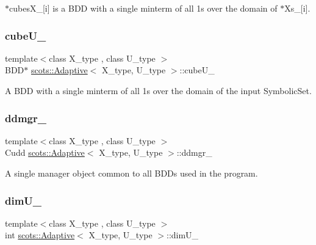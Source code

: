 $\ast$cubes\+X\+\_\+\mbox{[}i\mbox{]} is a B\+DD with a single minterm of all 1s over the domain of $\ast$\+Xs\+\_\+\mbox{[}i\mbox{]}. \mbox{\label{classscots_1_1Adaptive_a0332230a9bad14d432e6651611863be9}} 
\subsubsection{\texorpdfstring{cube\+U\+\_\+}{cubeU\_}}
{\footnotesize\ttfamily template$<$class X\+\_\+type , class U\+\_\+type $>$ \\
B\+DD$\ast$ \hyperlink{classscots_1_1Adaptive}{scots\+::\+Adaptive}$<$ X\+\_\+type, U\+\_\+type $>$\+::cube\+U\+\_\+}

A B\+DD with a single minterm of all 1s over the domain of the input Symbolic\+Set. \mbox{\label{classscots_1_1Adaptive_a4d986f797368f4e1f74dd7d8a37df2dd}} 
\subsubsection{\texorpdfstring{ddmgr\+\_\+}{ddmgr\_}}
{\footnotesize\ttfamily template$<$class X\+\_\+type , class U\+\_\+type $>$ \\
Cudd \hyperlink{classscots_1_1Adaptive}{scots\+::\+Adaptive}$<$ X\+\_\+type, U\+\_\+type $>$\+::ddmgr\+\_\+}

A single manager object common to all B\+D\+Ds used in the program. \mbox{\label{classscots_1_1Adaptive_ac26b29e9c729fd641af851f87e2ee2b4}} 
\subsubsection{\texorpdfstring{dim\+U\+\_\+}{dimU\_}}
{\footnotesize\ttfamily template$<$class X\+\_\+type , class U\+\_\+type $>$ \\
int \hyperlink{classscots_1_1Adaptive}{scots\+::\+Adaptive}$<$ X\+\_\+type, U\+\_\+type $>$\+::dim\+U\+\_\+}

